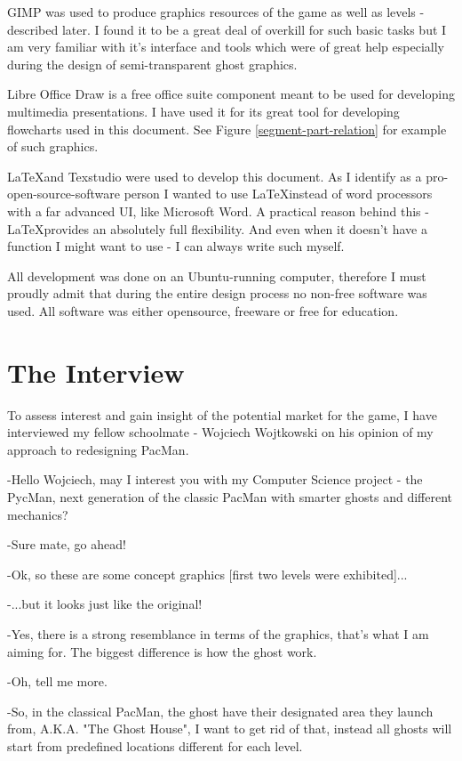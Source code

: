 \documentclass[11pt,a4paper,notitlepage]{report}
\begin{document}
			GIMP was used to produce graphics resources of the game as well as levels - described later. I found it to be a great deal of overkill for such basic tasks but I am very familiar with it's interface and tools which were of great help especially during the design of semi-transparent ghost graphics.
			
			Libre Office Draw is a free office suite component meant to be used for developing multimedia presentations. I have used it for its great tool for developing flowcharts used in this document. See Figure \ref{segment-part-relation} for example of such graphics.
			
			\LaTeX and Texstudio were used to develop this document. As I identify as a pro-open-source-software person I wanted to use \LaTeX instead of word processors with a far advanced UI, like Microsoft Word. A practical reason behind this - \LaTeX provides an absolutely full flexibility. And even when it doesn't have a function I might want to use - I can always write such myself.
			
			All development was done on an Ubuntu-running computer, therefore	
			I must proudly admit that during the entire design process no non-free software was used. All software was either opensource, freeware or free for education.
			\label{freeware}
			
		\section{The Interview}
			\label{interview}
			To assess interest and gain insight of the potential market for the game, I have interviewed my fellow schoolmate - Wojciech Wojtkowski on his opinion of my approach to redesigning PacMan.
			
			-Hello Wojciech, may I interest you with my Computer Science project - the PycMan, next generation of the classic PacMan with smarter ghosts and different mechanics?
			
			-Sure mate, go ahead!
			
			-Ok, so these are some concept graphics [first two levels were exhibited]...
			
			-...but it looks just like the original!
			
			-Yes, there is a strong resemblance in terms of the graphics, that's what I am aiming for. The biggest difference is how the ghost work.
			
			-Oh, tell me more.
			
			-So, in the classical PacMan, the ghost have their designated area they launch from, A.K.A. "The Ghost House", I want to get rid of that, instead all ghosts will start from predefined locations different for each level.
			
\end{document}
